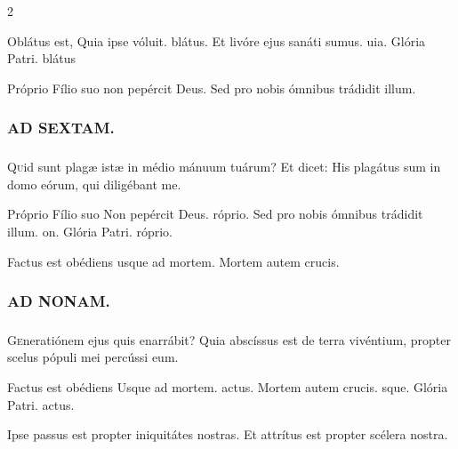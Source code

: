 \documentclass[9pt,twoside]{extarticle}
\begin{document}
\begin{multicols}{2}
\begin{tightlist}{}
\item {} Oblátus est, \textred{*} Quia ipse vóluit. blátus.  Et livóre ejus sanáti sumus. uia. Glória Patri. blátus 
\item {} Próprio Fílio suo non pepércit Deus.  Sed pro nobis ómnibus trádidit illum.
\end{tightlist}

\subsubsection*{\center \textsc{AD SEXTAM.}}
\subsubsection*{}
\lettrine{Q}uid sunt plagæ istæ in médio mánuum tuárum? Et dicet: His plagátus sum in domo eórum, qui diligébant me.

\begin{tightlist}{}
\item {} Próprio Fílio suo \textred{*} Non pepércit Deus. róprio.  Sed pro nobis ómnibus trádidit illum. on. Glória Patri. róprio.
\item {} Factus est obédiens usque ad mortem.  Mortem autem crucis.
\end{tightlist}

\subsubsection*{\center \textsc{AD NONAM.}}
\subsubsection*{}
\lettrine{G}eneratiónem ejus quis enarrábit? Quia abscíssus est de terra vivéntium, propter scelus pópuli mei percússi eum.

\begin{tightlist}{}
\item {} Factus est obédiens \textred{*} Usque ad mortem. actus.  Mortem autem crucis. sque. Glória Patri. actus.
\item {} Ipse passus est propter iniquitátes nostras.  Et attrítus est propter scélera nostra.
\end{tightlist}


\end{multicols}
\end{document}
